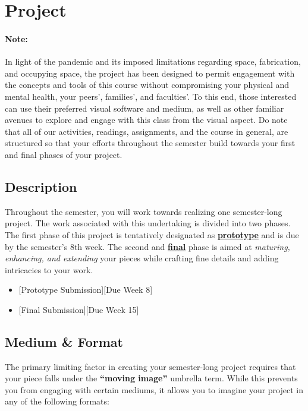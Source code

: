 \hypertarget{longproject}{\section{Project}}


\paragraph{Note:} In light of the pandemic and its imposed limitations regarding space, fabrication, and occupying space, the project has been designed to permit engagement with the concepts and tools of this course without compromising your physical and mental health, your peers', families', and faculties'. To this end, those interested can use their preferred visual software and medium, as well as other familiar avenues to explore and engage with this class from the visual aspect. Do note that all of our activities, readings, assignments, and the course in general, are structured so that your efforts throughout the semester build towards your first and final phases of your project.

\subsection{Description}

Throughout the semester, you will work towards realizing one semester-long project. The work associated with this undertaking is divided into two phases. The first phase of this project is tentatively designated as \ul{\textbf{prototype}} and is due by the semester's 8th week. The second and \ul{\textbf{final}} phase is aimed at \emph{maturing, enhancing, and extending} your pieces while crafting fine details and adding intricacies to your work.

\begin{itemize}
    \tightlist
    \item {}[Prototype Submission][Due Week 8]
    \item {}[Final Submission][Due Week 15]
\end{itemize}

\hypertarget{projformat}{\subsection{Medium \& Format}}

The primary limiting factor in creating your semester-long project requires that your piece falls under the \textbf{``moving image''} umbrella term. While this prevents you from engaging with certain mediums, it allows you to imagine your project in any of the following formats:

